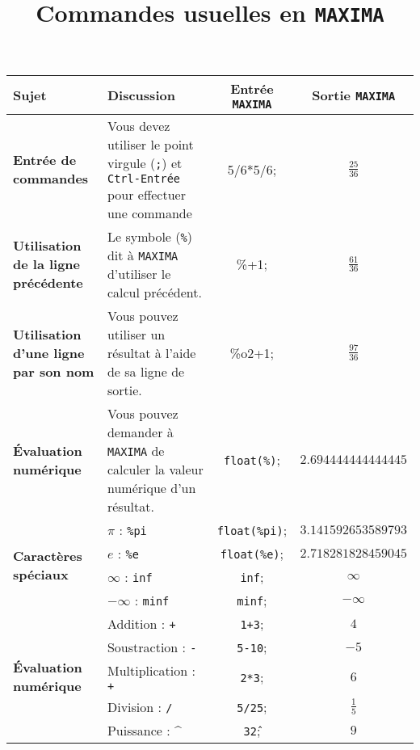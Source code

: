 \documentclass[8pt,landscape]{article}
\title{Commandes usuelles en \texttt{MAXIMA}}
\author{}
\date{}
\begin{document}
\maketitle

\begin{center}
\begin{longtable}{@{}p{4cm}p{10cm}cc@{}}
\toprule
\textbf{Sujet} & \textbf{Discussion} & \textbf{Entrée \texttt{MAXIMA}} & \textbf{Sortie \texttt{MAXIMA}} \\ 
\midrule
\endhead

\textbf{Entrée de commandes} & Vous devez utiliser le point virgule (\texttt{;}) et \texttt{Ctrl-Entrée} pour effectuer une commande &
5/6*5/6; & $\frac{25}{36}$ \\

\midrule

\textbf{Utilisation de la ligne précédente} & Le symbole (\texttt{\%}) dit à \texttt{MAXIMA} d'utiliser le calcul précédent. &
\%+1; & $\frac{61}{36}$ \\

\midrule

\textbf{Utilisation d'une ligne  par son nom} & Vous pouvez utiliser un résultat à l'aide de sa ligne de sortie. &
\%o2+1; & $\frac{97}{36}$ \\

\midrule

\textbf{Évaluation numérique} & Vous pouvez demander à \texttt{MAXIMA} de calculer la valeur numérique d'un résultat. &
\texttt{float(\%)}; & $2.694444444444445$ \\

\midrule

\multirow{4}{*}{\textbf{Caractères spéciaux}} & $\pi$ : \texttt{\%pi} & \texttt{float(\%pi)}; & $3.141592653589793$ \\
& $e$ : \texttt{\%e} & \texttt{float(\%e)}; & $2.718281828459045$ \\
& $\infty$ : \texttt{inf} & \texttt{inf}; & $\infty$ \\
& $-\infty$ : \texttt{minf} & \texttt{minf}; & $-\infty$ \\

\midrule

\multirow{5}{*}{\textbf{Évaluation numérique}} & Addition : \texttt{+} & \texttt{1+3}; & $4$ \\
& Soustraction : \texttt{-} & \texttt{5-10}; & $-5$ \\
& Multiplication : \texttt{+} & \texttt{2*3}; & $6$ \\
& Division : \texttt{/} & \texttt{5/25}; & $\frac{1}{5}$ \\
& Puissance : $\^$ & \texttt{3\^2}; & $9$ \\


\end{longtable}
\end{center}
\end{document}
